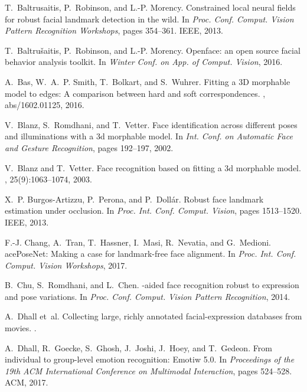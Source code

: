\documentclass[a4paper, 10pt, conference]{ieeeconf}
\begin{document}
\begin{thebibliography}{10}\itemsep=-1pt

T.~Baltrusaitis, P.~Robinson, and L.-P. Morency.
\newblock Constrained local neural fields for robust facial landmark detection
  in the wild.
\newblock In {\em Proc. Conf. Comput. Vision Pattern Recognition Workshops},
  pages 354--361. IEEE, 2013.

T.~Baltru{\v{s}}aitis, P.~Robinson, and L.-P. Morency.
\newblock Openface: an open source facial behavior analysis toolkit.
\newblock In {\em Winter Conf. on App. of Comput. Vision}, 2016.

A.~Bas, W.~A.~P. Smith, T.~Bolkart, and S.~Wuhrer.
\newblock Fitting a {3D} morphable model to edges: {A} comparison between hard
  and soft correspondences.
, abs/1602.01125, 2016.

V.~Blanz, S.~Romdhani, and T.~Vetter.
\newblock Face identification across different poses and illuminations with a
  3d morphable model.
\newblock In {\em Int. Conf. on Automatic Face and Gesture Recognition}, pages
  192--197, 2002.

V.~Blanz and T.~Vetter.
\newblock Face recognition based on fitting a 3d morphable model.
, 25(9):1063--1074, 2003.

X.~P. Burgos-Artizzu, P.~Perona, and P.~Doll{\'a}r.
\newblock Robust face landmark estimation under occlusion.
\newblock In {\em Proc. Int. Conf. Comput. Vision}, pages 1513--1520. IEEE,
  2013.

F.-J. Chang, A.~Tran, T.~Hassner, I.~Masi, R.~Nevatia, and G.~Medioni.
ace{P}ose{N}et: Making a case for landmark-free face alignment.
\newblock In {\em Proc. Int. Conf. Comput. Vision Workshops}, 2017.

B.~Chu, S.~Romdhani, and L.~Chen.
-aided face recognition robust to expression and pose variations.
\newblock In {\em Proc. Conf. Comput. Vision Pattern Recognition}, 2014.

A.~Dhall et~al.
\newblock Collecting large, richly annotated facial-expression databases from
  movies.
.

A.~Dhall, R.~Goecke, S.~Ghosh, J.~Joshi, J.~Hoey, and T.~Gedeon.
\newblock From individual to group-level emotion recognition: Emotiw 5.0.
\newblock In {\em Proceedings of the 19th ACM International Conference on
  Multimodal Interaction}, pages 524--528. ACM, 2017.


\end{thebibliography}
\end{document}
